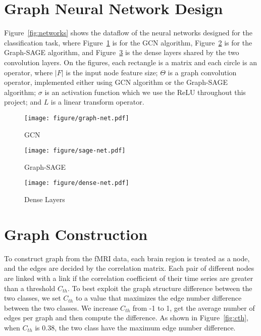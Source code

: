 \documentclass{article}
\begin{document}
\section{Graph Neural Network Design}
Figure~\ref{fig:networks} shows the dataflow of the neural networks designed for the classification task, where Figure~\ref{fig:graph-net} is for the GCN algorithm, Figure~\ref{fig:sage-net} is for the Graph-SAGE algorithm, and Figure~\ref{fig:dense-net} is the dense layers shared by the two convolution layers. On the figures, each rectangle is a matrix and each circle is an operator, where $|F|$ is the input node feature size; $\Theta$ is a graph convolution operator, implemented either using GCN algorithm or the Graph-SAGE algorithm; $\sigma$ is an activation function which we use the ReLU throughout this project; and $L$ is a linear transform operator.
\begin{figure*}[h]
\centering

    \begin{subfigure}{1\linewidth}
        \centering
        \texttt{[image: figure/graph-net.pdf]}
        \caption{GCN}
        \label{fig:graph-net}
    \end{subfigure}
    \begin{subfigure}{1\linewidth}
        \centering
        \texttt{[image: figure/sage-net.pdf]}
        \caption{Graph-SAGE}
        \label{fig:sage-net}
    \end{subfigure}
    \begin{subfigure}{1\linewidth}
        \centering
        \texttt{[image: figure/dense-net.pdf]}
        \caption{Dense Layers}
        \label{fig:dense-net}
    \end{subfigure}
    \caption{Graph Neural Networks}
    \label{fig:networks}
\end{figure*}

\section{Graph Construction}

To construct graph from the fMRI data, each brain region is treated as a node, and the edges are decided by the correlation matrix. Each pair of different nodes are linked with a link if the correlation coefficient of their time series are greater than a threshold $C_{th}$. To best exploit the graph structure difference between the two classes, we set $C_{th}$ to a value that maximizes the edge number difference between the two classes. We increase $C_{th}$ from -1 to 1, get the average number of edges per graph and then compute the difference. As shown in Figure~\ref{fig:cth}, when $C_{th}$ is 0.38, the two class have the maximum edge number difference.
\end{document}
